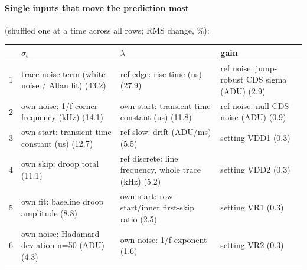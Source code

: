 \paragraph{Single inputs that move the prediction most} (shuffled one at a time across all rows; RMS change, \%):
\begin{center}\footnotesize
\begin{tabular}{rp{}p{}p{}}
\toprule
 & $\sigma_e$ & $\lambda$ & gain \\
\midrule
1 & trace noise term (white noise / Allan fit) (43.2) & ref edge: rise time (ns) (27.9) & ref noise: jump-robust CDS sigma (ADU) (2.9) \\
2 & own noise: 1/f corner frequency (kHz) (14.1) & own start: transient time constant (us) (11.8) & ref noise: null-CDS noise (ADU) (0.9) \\
3 & own start: transient time constant (us) (12.7) & ref slow: drift (ADU/ms) (5.5) & setting VDD1 (0.3) \\
4 & own skip: droop total (11.1) & ref discrete: line frequency, whole trace (kHz) (5.2) & setting VDD2 (0.3) \\
5 & own fit: baseline droop amplitude (8.8) & own start: row-start/inner first-skip ratio (2.5) & setting VR1 (0.3) \\
6 & own noise: Hadamard deviation n=50 (ADU) (4.3) & own noise: 1/f exponent (1.6) & setting VR2 (0.3) \\
\bottomrule
\end{tabular}
\end{center}
